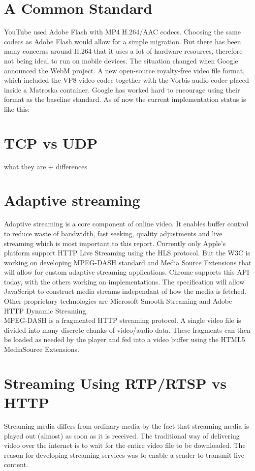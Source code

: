 \begin{itemize}
\section{A Common Standard}
YouTube used Adobe Flash with MP4 H.264/AAC codecs. Choosing the same codecs as Adobe Flash would allow for a simple migration. But there has been many concerns around H.264 that it uses a lot of hardware resources, therefore not being ideal to run on mobile devices. The situation changed when Google announced the WebM project. A new open-source royalty-free video file format, which included the VP8 video codec together with the Vorbis audio codec placed inside a Matroska container. Google has worked hard to encourage using their format as the baseline standard. As of now the current implementation status is like this:

\section{TCP vs UDP}
what they are + differences

\section{Adaptive streaming}
Adaptive streaming is a core component of online video. It enables buffer control to reduce waste of bandwidth, fast seeking, quality adjustments and live streaming which is most important to this report. Currently only Apple’s platform support HTTP Live Streaming using the HLS protocol. But the W3C is working on developing MPEG-DASH standard and Media Source Extensions that will allow for custom adaptive streaming applications. Chrome supports this API today, with the others working on implementations. The specification will allow JavaScript to construct media streams independant of how the media is fetched.
Other proprietary technologies are Microsoft Smooth Streaming and Adobe HTTP Dynamic Streaming.
\\
MPEG-DASH is a fragmented HTTP streaming protocol. A single video file is divided into many discrete chunks of video/audio data. These fragments can then be loaded as needed by the player and fed into a video buffer using the HTML5 MediaSource Extensions.

\section{Streaming Using RTP/RTSP vs HTTP}
Streaming media differs from ordinary media by the fact that streaming media is played out (almost) as soon as it is received. The traditional way of delivering video over the internet is to wait for the entire video file to be downloaded. The reason for developing streaming services was to enable a sender to transmit live content.


\end{itemize}
